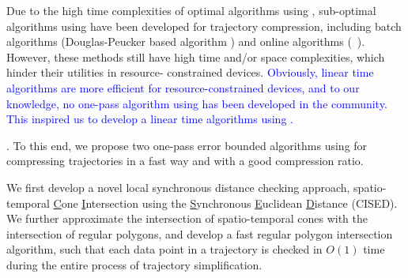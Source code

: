 Due to the high time complexities of optimal \lsa algorithms using \sed, sub-optimal \lsa algorithms using \sed have been developed for trajectory compression, including batch algorithms (\eg Douglas-Peucker based algorithm \dpsed \cite{Meratnia:Spatiotemporal}) and online algorithms (\eg\ \squishe \cite{Muckell:Compression}).
However, these methods still have high time and/or space complexities, which hinder their utilities in resource-
constrained devices. %
%
\textcolor{blue}{Obviously, linear time \lsa algorithms are more efficient for resource-constrained devices, and to our knowledge, no one-pass \lsa algorithm using \sed has been developed in the community. This inspired us to develop a linear time \lsa algorithms using \sed. }






.
To this end, we propose two one-pass error bounded \lsa algorithms using \sed for compressing trajectories in a fast way and with a good compression ratio. %

 We first develop a novel local synchronous distance checking approach, \ie spatio-temporal \underline{C}one \underline{I}ntersection using the \underline{S}ynchronous \underline{E}uclidean \underline{D}istance (CISED).
We further approximate the intersection of spatio-temporal cones with the intersection of regular polygons, and develop a fast regular polygon intersection algorithm, such that each data point in a trajectory is checked in $O(1)$ time during the entire process of trajectory simplification.

